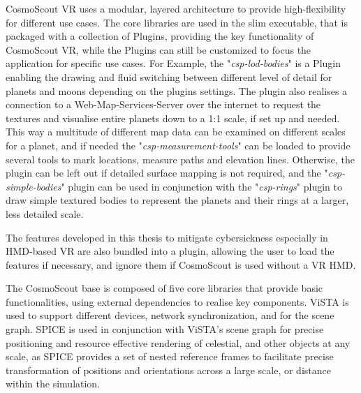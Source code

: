 CosmoScout VR uses a modular, layered architecture to provide high-flexibility for different use cases.
The core libraries are used in the slim executable, that is packaged with a collection of Plugins, providing
the key functionality of CosmoScout VR, while the Plugins can still be customized to focus the application for
specific use cases.
For Example, the "\textit{csp-lod-bodies}" is a Plugin enabling the drawing and fluid switching between different
level of detail for planets and moons depending on the plugins settings.
The plugin also realises a connection to a Web-Map-Services-Server over the internet to request the textures and
visualise entire planets down to a 1:1 scale, if set up and needed.
This way a multitude of different map data can be examined on different scales for a planet, and if needed the
"\textit{csp-measurement-tools}" can be loaded to provide several tools to mark locations, measure paths and
elevation lines.
Otherwise, the plugin can be left out if detailed surface mapping is not required, and the
"\textit{csp-simple-bodies}" plugin can be used in conjunction with the "\textit{csp-rings}" plugin to draw simple
textured bodies to represent the planets and their rings at a larger, less detailed scale.

The features developed in this thesis to mitigate cybersickness especially in HMD-based VR are also bundled into a
plugin, allowing the user to load the features if necessary, and ignore them if CosmoScout is used without a
VR HMD\@.

The CosmoScout base is composed of five core libraries that provide basic functionalities, using external
dependencies to realise key components.
ViSTA is used to support different devices, network synchronization, and for the scene graph.
SPICE is used in conjunction with ViSTA's scene graph for precise positioning and resource effective rendering of
celestial, and other objects at any scale, as SPICE provides a set of nested reference frames to facilitate precise
transformation of positions and orientations across a large scale, or distance within the simulation.
